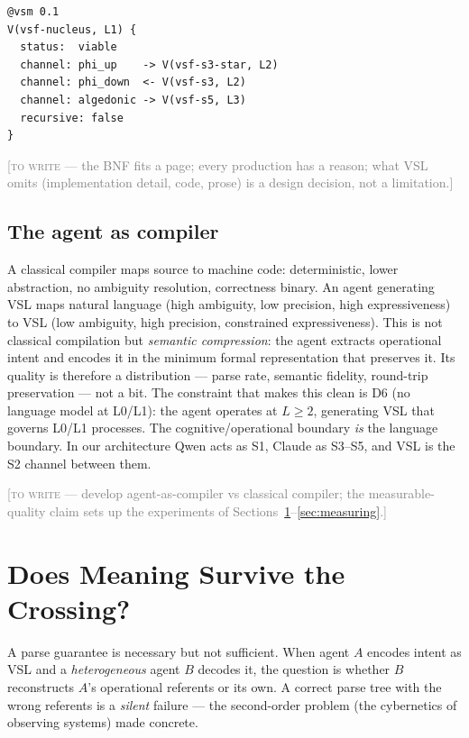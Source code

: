 \documentclass[12pt]{article}
\newcommand{\TODO}[1]{\medskip\noindent\textcolor{gray}{\small[\textsc{to write} --- #1]}\medskip}
\begin{document}
\begin{lstlisting}
@vsm 0.1
V(vsf-nucleus, L1) {
  status:  viable
  channel: phi_up    -> V(vsf-s3-star, L2)
  channel: phi_down  <- V(vsf-s3, L2)
  channel: algedonic -> V(vsf-s5, L3)
  recursive: false
}
\end{lstlisting}

\TODO{the BNF fits a page; every production has a reason; what VSL omits (implementation
detail, code, prose) is a design decision, not a limitation.}

\subsection{The agent as compiler}
\label{sec:agent}

A classical compiler maps source to machine code: deterministic, lower abstraction, no
ambiguity resolution, correctness binary. An agent generating VSL maps natural language
(high ambiguity, low precision, high expressiveness) to VSL (low ambiguity, high
precision, constrained expressiveness). This is not classical compilation but
\emph{semantic compression}: the agent extracts operational intent and encodes it in
the minimum formal representation that preserves it. Its quality is therefore a
distribution --- parse rate, semantic fidelity, round-trip preservation --- not a bit.
The constraint that makes this clean is D6 (no language model at L0/L1): the agent
operates at $L \ge 2$, generating VSL that governs L0/L1 processes. The
cognitive/operational boundary \emph{is} the language boundary. In our architecture
Qwen acts as S1, Claude as S3--S5, and VSL is the S2 channel between them.

\TODO{develop agent-as-compiler vs classical compiler; the measurable-quality claim sets
up the experiments of Sections~\ref{sec:substrate}--\ref{sec:measuring}.}

\section{Does Meaning Survive the Crossing?}
\label{sec:substrate}

A parse guarantee is necessary but not sufficient. When agent $A$ encodes intent as VSL
and a \emph{heterogeneous} agent $B$ decodes it, the question is whether $B$ reconstructs
$A$'s operational referents or its own. A correct parse tree with the wrong referents is
a \emph{silent} failure --- the second-order problem (the cybernetics of observing
systems) made concrete.
\end{document}
